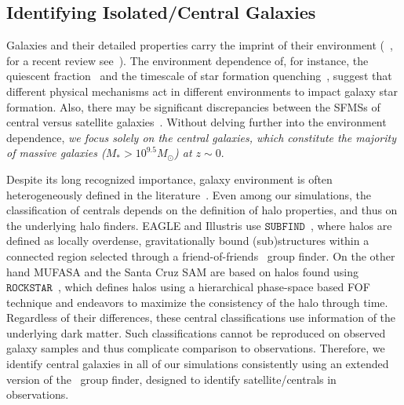 \documentclass[preprint2,tighten]{aastex62}
\begin{document}
\subsection{Identifying Isolated/Central Galaxies} \label{sec:central}
Galaxies and their detailed properties carry the 
imprint of their environment (~\citealt{hubble1936, oemler1974, dressler1980, guzzo1997}, 
for a recent review see~\citealp{blanton2009}). The environment
dependence of, for instance, the quiescent 
fraction~\citep[\emph{e.g.}][]{baldry2006,peng2010,hahn2015}
and the timescale of star formation quenching~\citep{wetzel2013,hahn2017}, 
suggest that different physical mechanisms act in different environments 
to impact galaxy star formation. Also, there may be significant 
discrepancies between the SFMSs of central versus satellite 
galaxies~\citep{wang2018}. Without delving further into the 
environment dependence, \emph{we focus solely on the central galaxies, 
which constitute the majority of massive galaxies ($M_* > 10^{9.5}M_\odot$) 
at $z \sim 0$}. 

Despite its long recognized importance, galaxy environment is often 
heterogeneously defined in the literature~\cite{muldrew2012}. Even among our 
simulations, the classification of centrals depends on 
the definition of halo properties, and thus on the underlying halo 
finders. EAGLE and Illustris use $\mathtt{SUBFIND}$~\citep{springel2001},
where halos are defined as locally overdense, gravitationally bound
(sub)structures within a connected region selected through a 
friend-of-friends~\citep[FOF;][]{davis1985} group finder. On the other hand 
MUFASA and the Santa Cruz SAM are based on halos found using 
$\mathtt{ROCKSTAR}$~\citep{behroozi2013}, which defines halos using a
hierarchical phase-space based FOF technique and endeavors to maximize 
the consistency of the halo through time.  
Regardless of their differences, these central classifications use 
information of the underlying dark matter. Such classifications 
cannot be reproduced on observed galaxy samples and thus complicate 
comparison to observations. Therefore, we identify central galaxies in 
all of our simulations 
consistently using an extended version of the~\cite{tinker2011} group 
finder, designed to identify satellite/centrals in observations. 
\end{document}
